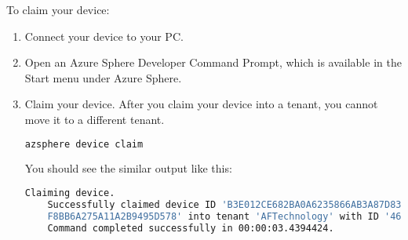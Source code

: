 To claim your device:
\begin{enumerate}
    \item Connect your device to your PC.
    \item Open an Azure Sphere Developer Command Prompt, which is available in the Start menu under Azure Sphere.
    \item Claim your device. After you claim your device into a tenant, you cannot move it to a different tenant.
    \begin{lstlisting}[language=bash]
    azsphere device claim
    \end{lstlisting}
    You should see the similar output like this:
    \begin{lstlisting}[language=bash]
    Claiming device.
    Successfully claimed device ID 'B3E012CE682BA0A6235866AB3A87D838A4817E5C539832A34BF7A715CA8D015FF99C84B909CB2886916259AD186B212E148FC9C4B
    F8BB6A275A11A2B9495D578' into tenant 'AFTechnology' with ID '4679af44-ad27-4c1d-9ef8-4f76b540edae'. 
    Command completed successfully in 00:00:03.4394424.
    \end{lstlisting}
\end{enumerate}

\newpage


